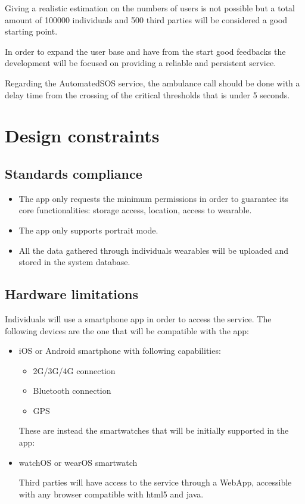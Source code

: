 Giving a realistic estimation on the numbers of users is not possible but a total amount of 100000 individuals and 500 third parties will be considered a good starting point.

In order to expand the user base and have from the start good feedbacks the development will be focused on providing a reliable and persistent service. 

Regarding the AutomatedSOS service, the ambulance call should be done with a delay time from the crossing of the critical thresholds that is under 5 seconds.

\section{Design constraints}
\subsection{Standards compliance}
\begin{itemize}
\item The app only requests the minimum permissions in order to guarantee its core functionalities: storage access, location, access to wearable.
\item The app only supports portrait mode.
\item All the data gathered through individuals wearables will be uploaded and stored in the system database.
\end{itemize}


\subsection{Hardware limitations}
Individuals will use a smartphone app in order to access the service.
The following devices are the one that will be compatible with the app:
\begin{itemize}
\item iOS or Android smartphone with following capabilities:
\begin{itemize}
\item 2G/3G/4G connection
\item Bluetooth connection
\item GPS
\end{itemize}
These are instead the smartwatches that will be initially supported in the app:
\item watchOS or wearOS smartwatch


Third parties will have access to the service through a WebApp, accessible with any browser compatible with html5 and java.
\end{itemize}

